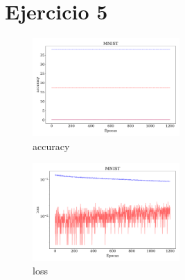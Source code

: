 \section*{Ejercicio 5}

\begin{figure}[H]
    \centering
    \includegraphics[width=0.5\textwidth]{plots/ejer_5_MNIST_acc.pdf}
    \caption{accuracy}
    \label{fig:ejer5_mnist_acc}
\end{figure} 

\begin{figure}[H]
    \centering
    \includegraphics[width=0.5\textwidth]{plots/ejer_5_MNIST_los.pdf}
    \caption{loss}
    \label{fig:ejer5_mnist_loss}
\end{figure} 




